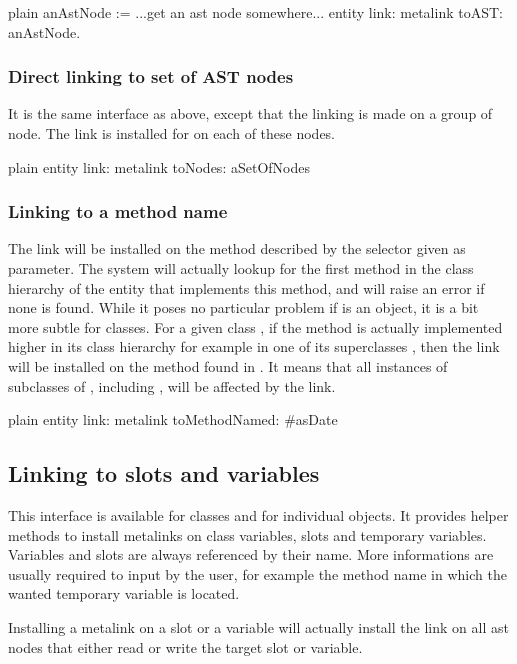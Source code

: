 \documentclass[10pt,twoside,english]{_support/latex/sbabook/sbabook}
\begin{document}
\begin{displaycode}{plain}
anAstNode := ...get an ast node somewhere...
entity link: metalink toAST: anAstNode.
\end{displaycode}
\subsubsection{Direct linking to set of AST nodes}
It is the same interface as above, except that the linking is made on a group of node. The link is installed for  on each of these nodes.

\begin{displaycode}{plain}
entity link: metalink toNodes: aSetOfNodes
\end{displaycode}
\subsubsection{Linking to a method name}
The link will be installed on the method described by the selector given as parameter. The system will actually lookup for the first method in the class hierarchy of the entity that implements this method, and will raise an error if none is found. While it poses no particular problem if  is an object, it is a bit more subtle for classes. For a given class , if the method is actually implemented higher in its class hierarchy for example in one of its superclasses , then the link will be installed on the method found in . It means that all instances of subclasses of , including , will be affected by the link.

\begin{displaycode}{plain}
entity link: metalink toMethodNamed: #asDate
\end{displaycode}
\subsection{Linking to slots and variables}
This interface is available for classes and for individual objects. It provides helper methods to install metalinks on class variables, slots and temporary variables. Variables and slots are always referenced by their name. More informations are usually required to input by the user, for example the method name in which the wanted temporary variable is located.

Installing a metalink on a slot or a variable will actually install the link on all ast nodes that either read or write the target slot or variable.
\end{document}
